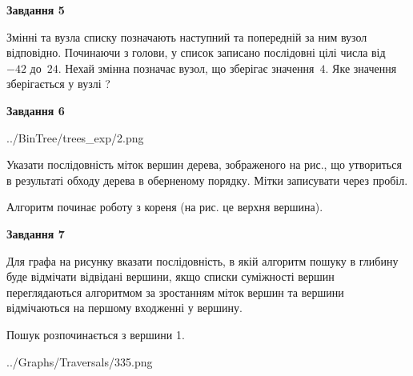 \documentclass[12pt, ukrainian]{article}
\begin{document}
{\begin {large}
{\begin {center}\textbf{Завдання 5}\end {center}}\par
Змінні  та  вузла списку позначають наступний та попередній за ним вузол відповідно. Починаючи з голови, у список записано послідовні цілі числа від~$-42$ до~$24$. Нехай змінна  позначає вузол, що зберігає значення~$4$.
Яке значення зберігається у вузлі  ?\par
\newpage

{\begin {center}\textbf{Завдання 6}\end {center}}\par

\begin{center}
	{../BinTree/trees_exp/2.png}
\end{center}
Указати послідовність міток вершин дерева, зображеного на рис., що утвориться в результаті обходу дерева в оберненому порядку. Мітки записувати через пробіл.\par Алгоритм починає роботу з кореня (на рис. це верхня вершина).\par
\newpage

{\begin {center}\textbf{Завдання 7}\end {center}}\par
Для графа на рисунку вказати послідовність, в якій алгоритм пошуку в глибину буде відмічати відвідані вершини, якщо списки суміжності вершин переглядаються алгоритмом за зростанням міток вершин та вершини відмічаються на першому вход\-женні у вершину.\par
Пошук розпочинається з вершини 1.\par

\begin{center}
	{../Graphs/Traversals/335.png}
\end{center}\par
\newpage


\end{large}}
\end{document}
